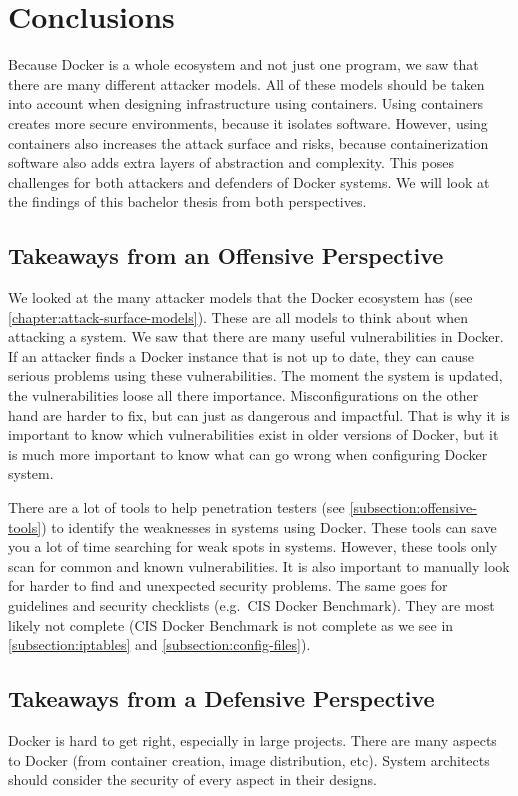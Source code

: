 \chapter{Conclusions}
Because Docker is a whole ecosystem and not just one program, we saw that there are many different attacker models. All of these models should be taken into account when designing infrastructure using containers. Using containers creates more secure environments, because it isolates software. However, using containers also increases the attack surface and risks, because containerization software also adds extra layers of abstraction and complexity. This poses challenges for both attackers and defenders of Docker systems. We will look at the findings of this bachelor thesis from both perspectives.

\section{Takeaways from an Offensive Perspective}
We looked at the many attacker models that the Docker ecosystem has (see \autoref{chapter:attack-surface-models}). These are all models to think about when attacking a system. We saw that there are many useful vulnerabilities in Docker. If an attacker finds a Docker instance that is not up to date, they can cause serious problems using these vulnerabilities. The moment the system is updated, the vulnerabilities loose all there importance. Misconfigurations on the other hand are harder to fix, but can just as dangerous and impactful. That is why it is important to know which vulnerabilities exist in older versions of Docker, but it is much more important to know what can go wrong when configuring Docker system.

\medskip

There are a lot of tools to help penetration testers (see \autoref{subsection:offensive-tools}) to identify the weaknesses in systems using Docker. These tools can save you a lot of time searching for weak spots in systems. However, these tools only scan for common and known vulnerabilities. It is also important to manually look for harder to find and unexpected security problems.
The same goes for guidelines and security checklists (e.g.\ CIS Docker Benchmark). They are most likely not complete (CIS Docker Benchmark is not complete as we see in \autoref{subsection:iptables} and \autoref{subsection:config-files}).

\section{Takeaways from a Defensive Perspective}
Docker is hard to get right, especially in large projects. There are many aspects to Docker (from container creation, image distribution, etc). System architects should consider the security of every aspect in their designs.

